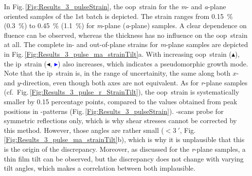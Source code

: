 In Fig.\,\ref{Fig:Results_3_pulseStrain}, the \gls{oop}\ strain for the \textit{m}- and \textit{a}-plane oriented samples of the 1st batch is depicted.
The strain ranges from
    \qty{0.15}{\percent} (\qty{0.3}{\percent})
to
    \qty{0.45}{\percent} (\qty{1.1}{\percent})
for \textit{m}-plane (\textit{a}-plane) samples.
A clear dependence on fluence can be observed, whereas the thickness has no influence on the \gls{oop}\ strain at all.
The complete in- and out-of-plane strains for \textit{m}-plane samples are depicted in Fig.\,\ref{Fig:Results_3_pulse_ma_strainTilt}a.
With increasing \gls{oop}\ strain (\textcolor{col-brightGreen}{$\blacktriangle$}), the \gls{ip}\ strain (\textcolor{col-purple}{$\blacktriangleleft$}, \textcolor{blue}{$\blacktriangleright$}) also increases, which indicates a pseudomorphic growth mode.
Note that the \gls{ip}\ strain is, in the range of uncertainity, the same along both $x$- and $y$-direction, even though both axes are not equivalent.
As for \textit{r}-plane samples (cf.\ Fig.\,\ref{Fig:Results_3_pulse_r_StrainTilt}), the \gls{oop}\ strain is systematically smaller by 0.15 percentage points, compared to the values obtained from peak positions in \thetaomega-patterns (Fig.\,\ref{Fig:Results_3_pulseStrain}).
\thetaomega-scans probe for symmetric reflections only, which is why shear stresses cannot be corrected by this method.
However, those angles are rather small ($<\qty{3}{\arcminute}$, Fig.\,\ref{Fig:Results_3_pulse_ma_strainTilt}b), which is why it is unplausible that this is the origin of the discrepancy.
Moreover, as discussed for the \textit{r}-plane samples, a thin film tilt can be observed, but the discrepancy does not change with varying tilt angles, which makes a correlation between both implausible.
